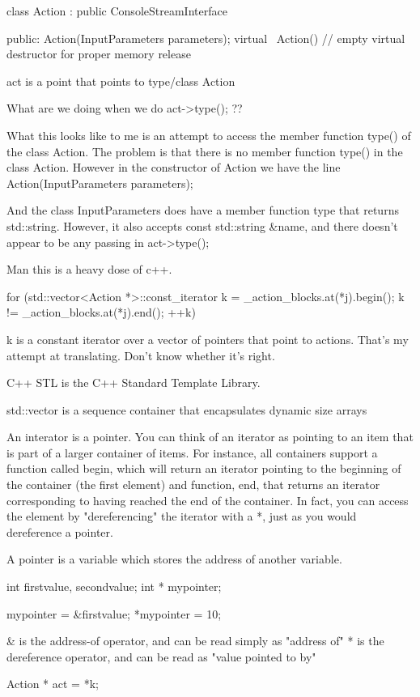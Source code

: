 class Action : public ConsoleStreamInterface
{
public:
  Action(InputParameters parameters);
  virtual ~Action() {}                  // empty virtual destructor for proper memory release


act is a point that points to type/class Action

What are we doing when we do act->type(); ??

What this looks like to me is an attempt to access the member function type() of the class Action. The problem is that there is no member function type() in the class Action. However in the constructor of Action we have the line   Action(InputParameters parameters);

And the class InputParameters does have a member function type that returns std::string. However, it also accepts const std::string &name, and there doesn't appear to be any passing in act->type();

Man this is a heavy dose of c++.

      for (std::vector<Action *>::const_iterator k = _action_blocks.at(*j).begin(); k != _action_blocks.at(*j).end(); ++k)

k is a constant iterator over a vector of pointers that point to actions. That's my attempt at translating. Don't know whether it's right.

C++ STL is the C++ Standard Template Library.

std::vector is a sequence container that encapsulates dynamic size arrays

An interator is a pointer. You can think of an iterator as pointing to an item that is part of a larger container of items.  For instance, all containers support a function called begin, which will return an iterator pointing to the beginning of the container (the first element) and function, end, that returns an iterator corresponding to having reached the end of the container. In fact, you can access the element by "dereferencing" the iterator with a *, just as you would dereference a pointer.

A pointer is a variable which stores the address of another variable.

int firstvalue, secondvalue;
  int * mypointer;

  mypointer = &firstvalue;
  *mypointer = 10;


    & is the address-of operator, and can be read simply as "address of"
    * is the dereference operator, and can be read as "value pointed to by"

        Action * act = *k;

}
